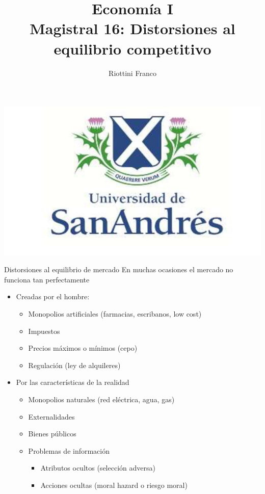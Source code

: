 \documentclass{beamer}
\title[Economía I]{Economía I \vspace{4mm}
\\ Magistral 16: Distorsiones al equilibrio competitivo}
\date{}
\author[Riottini]{Riottini Franco}
\institute[]{Universidad de San Andrés}
\begin{document}
\begin{frame}
\titlepage
\centering
\includegraphics[scale=0.2]{../Figures/logoUDESA.jpg} 
\end{frame}

\begin{frame}{Distorsiones al equilibrio de mercado}
    En muchas ocasiones el mercado no funciona tan perfectamente
    \begin{itemize}
        \item Creadas por el hombre:
        \begin{itemize}
            \item Monopolios artificiales (farmacias, escribanos, low cost)
             \vspace{1mm}
            \item Impuestos
             \vspace{1mm}
            \item Precios máximos o mínimos (cepo)
             \vspace{1mm}
            \item Regulación (ley de alquileres)
        \end{itemize}
        \item Por las características de la realidad
        \begin{itemize}
            \item Monopolios naturales (red eléctrica, agua, gas)   
             \vspace{1mm}
            \item Externalidades
             \vspace{1mm}
            \item Bienes públicos
            \vspace{1mm}
            \item Problemas de información
            \begin{itemize}
                \item Atributos ocultos (selección adversa)
                 \vspace{1mm}
                \item Acciones ocultas (moral hazard o riesgo moral)
            \end{itemize}        
        \end{itemize}
    \end{itemize}
\end{frame}
\end{document}
